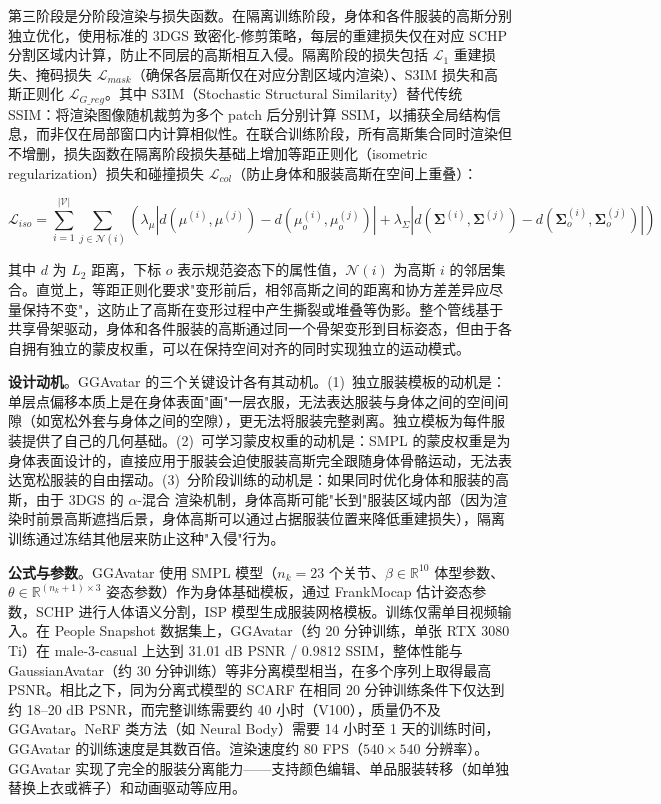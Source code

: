 第三阶段是分阶段渲染与损失函数。在隔离训练阶段，身体和各件服装的高斯分别独立优化，使用标准的 3DGS 致密化-修剪策略，每层的重建损失仅在对应 SCHP 分割区域内计算，防止不同层的高斯相互入侵。隔离阶段的损失包括 $\mathcal{L}_1$ 重建损失、掩码损失 $\mathcal{L}_{mask}$（确保各层高斯仅在对应分割区域内渲染）、S3IM 损失和高斯正则化 $\mathcal{L}_{G\_reg}$。其中 S3IM（Stochastic Structural Similarity）替代传统 SSIM：将渲染图像随机裁剪为多个 patch 后分别计算 SSIM，以捕获全局结构信息，而非仅在局部窗口内计算相似性。在联合训练阶段，所有高斯集合同时渲染但不增删，损失函数在隔离阶段损失基础上增加等距正则化（isometric regularization）损失和碰撞损失 $\mathcal{L}_{col}$（防止身体和服装高斯在空间上重叠）：

\begin{equation}
\mathcal{L}_{iso} = \sum_{i=1}^{|\mathcal{V}|} \sum_{j \in \mathcal{N}(i)} \left(\lambda_\mu |d(\mu^{(i)}, \mu^{(j)}) - d(\mu_o^{(i)}, \mu_o^{(j)})| + \lambda_\Sigma |d(\boldsymbol{\Sigma}^{(i)}, \boldsymbol{\Sigma}^{(j)}) - d(\boldsymbol{\Sigma}_o^{(i)}, \boldsymbol{\Sigma}_o^{(j)})|\right)
\end{equation}

其中 $d$ 为 $L_2$ 距离，下标 $o$ 表示规范姿态下的属性值，$\mathcal{N}(i)$ 为高斯 $i$ 的邻居集合。直觉上，等距正则化要求"变形前后，相邻高斯之间的距离和协方差差异应尽量保持不变"，这防止了高斯在变形过程中产生撕裂或堆叠等伪影。整个管线基于共享骨架驱动，身体和各件服装的高斯通过同一个骨架变形到目标姿态，但由于各自拥有独立的蒙皮权重，可以在保持空间对齐的同时实现独立的运动模式。

\textbf{设计动机}。GGAvatar 的三个关键设计各有其动机。(1)~独立服装模板的动机是：单层点偏移本质上是在身体表面"画"一层衣服，无法表达服装与身体之间的空间间隙（如宽松外套与身体之间的空隙），更无法将服装完整剥离。独立模板为每件服装提供了自己的几何基础。(2)~可学习蒙皮权重的动机是：SMPL 的蒙皮权重是为身体表面设计的，直接应用于服装会迫使服装高斯完全跟随身体骨骼运动，无法表达宽松服装的自由摆动。(3)~分阶段训练的动机是：如果同时优化身体和服装的高斯，由于 3DGS 的 $\alpha$-混合 渲染机制，身体高斯可能"长到"服装区域内部（因为渲染时前景高斯遮挡后景，身体高斯可以通过占据服装位置来降低重建损失），隔离训练通过冻结其他层来防止这种"入侵"行为。

\textbf{公式与参数}。GGAvatar 使用 SMPL 模型（$n_k = 23$ 个关节、$\beta \in \mathbb{R}^{10}$ 体型参数、$\theta \in \mathbb{R}^{(n_k+1) \times 3}$ 姿态参数）作为身体基础模板，通过 FrankMocap 估计姿态参数，SCHP 进行人体语义分割，ISP 模型生成服装网格模板。训练仅需单目视频输入。在 People Snapshot 数据集上，GGAvatar（约 20 分钟训练，单张 RTX 3080 Ti）在 male-3-casual 上达到 31.01 dB PSNR / 0.9812 SSIM，整体性能与 GaussianAvatar（约 30 分钟训练）等非分离模型相当，在多个序列上取得最高 PSNR。相比之下，同为分离式模型的 SCARF 在相同 20 分钟训练条件下仅达到约 18--20 dB PSNR，而完整训练需要约 40 小时（V100），质量仍不及 GGAvatar。NeRF 类方法（如 Neural Body）需要 14 小时至 1 天的训练时间，GGAvatar 的训练速度是其数百倍。渲染速度约 80 FPS（$540 \times 540$ 分辨率）。GGAvatar 实现了完全的服装分离能力——支持颜色编辑、单品服装转移（如单独替换上衣或裤子）和动画驱动等应用。

